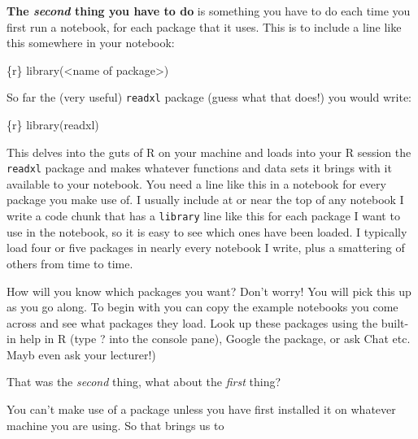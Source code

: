 \documentclass[
  letterpaper,
  DIV=11,
  numbers=noendperiod]{scrreprt}
\newenvironment{Shaded}{\begin{snugshade}}{\end{snugshade}}
\newcommand{\InformationTok}[1]{\textcolor[rgb]{0.37,0.37,0.37}{#1}}
\begin{document}
\textbf{The \emph{second} thing you have to do} is something you have to
do each time you first run a notebook, for each package that it uses.
This is to include a line like this somewhere in your notebook:

\begin{Shaded}
\begin{Highlighting}[]
\InformationTok{\textasciigrave{}\textasciigrave{}\textasciigrave{}\{r\}}
\InformationTok{library(\textless{}name of package\textgreater{})}
\InformationTok{\textasciigrave{}\textasciigrave{}\textasciigrave{}}
\end{Highlighting}
\end{Shaded}

So far the (very useful) \texttt{readxl} package (guess what that does!)
you would write:

\begin{Shaded}
\begin{Highlighting}[]
\InformationTok{\textasciigrave{}\textasciigrave{}\textasciigrave{}\{r\}}
\InformationTok{library(readxl)}
\InformationTok{\textasciigrave{}\textasciigrave{}\textasciigrave{}}
\end{Highlighting}
\end{Shaded}

This delves into the guts of R on your machine and loads into your R
session the \texttt{readxl} package and makes whatever functions and
data sets it brings with it available to your notebook. You need a line
like this in a notebook for every package you make use of. I usually
include at or near the top of any notebook I write a code chunk that has
a \texttt{library} line like this for each package I want to use in the
notebook, so it is easy to see which ones have been loaded. I typically
load four or five packages in nearly every notebook I write, plus a
smattering of others from time to time.

How will you know which packages you want? Don't worry! You will pick
this up as you go along. To begin with you can copy the example
notebooks you come across and see what packages they load. Look up these
packages using the built-in help in R (type ? into the console pane),
Google the package, or ask Chat etc. Mayb even ask your lecturer!)

That was the \emph{second} thing, what about the \emph{first} thing?

You can't make use of a package unless you have first installed it on
whatever machine you are using. So that brings us to
\end{document}
